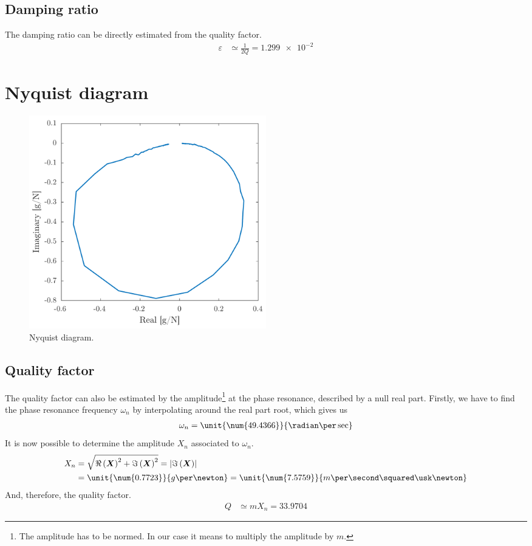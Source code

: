 \documentclass[a4paper, 12pt]{article}
\begin{document}
	\subsection{Damping ratio}
	The damping ratio can be directly estimated from the quality factor.
	\begin{align*}
		\varepsilon & \simeq \frac{1}{2 Q} = \num{1.299e-2}
	\end{align*}
	\section{Nyquist diagram}
	\begin{figure}[h]
		\centering
		\includegraphics[width=0.5\textwidth]{resources/pdf/nyquist.pdf}
		\caption{Nyquist diagram.}
	\end{figure}
	\subsection{Quality factor}
	The quality factor can also be estimated by the amplitude\footnote{The amplitude has to be normed. In our case it means to multiply the amplitude by $m$.} at the phase resonance, described by a null real part. Firstly, we have to find the phase resonance frequency $\omega_n$ by interpolating around the real part root, which gives us
	\begin{align*}
		\omega_n = \unit{\num{49.4366}}{\radian\per\sec}
	\end{align*}
	It is now possible to determine the amplitude $X_n$ associated to $\omega_n$.
	\begin{align*}
		X_n & = \sqrt{\Re \left({\bm X}\right)^2 + \Im \left({\bm X}\right)^2} = \left|\Im \left({\bm X}\right)\right| \\
			& = \unit{\num{0.7723}}{g\per\newton} = \unit{\num{7.5759}}{m\per\second\squared\usk\newton} 
	\end{align*}
	And, therefore, the quality factor.
	\begin{align*}
		Q & \simeq m X_n = \num{33.9704}
	\end{align*}
\end{document}
